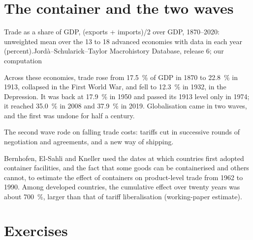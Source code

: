\section{The container and the two waves}\label{sec:b3:gravity:waves}

\begin{omchart}{Trade as a share of GDP, (exports + imports)/2 over GDP, 1870--2020:
unweighted mean over the 13 to 18 advanced economies with data in each
year (percent).}{Jord\`a--Schularick--Taylor Macrohistory Database, release 6; our computation}
\end{omchart}

\begin{record}
Across these economies, trade rose from 17.5~\% of GDP in 1870 to 22.8~\% in 1913,
collapsed in the First World War, and fell to 12.3~\% in 1932, in the Depression. It
was back at 17.9~\% in 1950 and passed its 1913 level only in 1974; it reached 35.0~\%
in 2008 and 37.9~\% in 2019. Globalisation came in two waves, and the first was
undone for half a century.
\end{record}

The second wave rode on falling trade costs: tariffs cut in successive rounds of
negotiation and agreements, and a new way of shipping.

\begin{record}
Bernhofen, El-Sahli and Kneller used the dates at which countries first adopted
container facilities, and the fact that some goods can be containerised and
others cannot, to estimate the effect of containers on product-level trade from
1962 to 1990. Among developed countries, the cumulative effect over twenty years
was about 700~\%, larger than that of tariff liberalisation (working-paper
estimate). %
\end{record}

\section{Exercises}\label{sec:b3:gravity:exercises}

